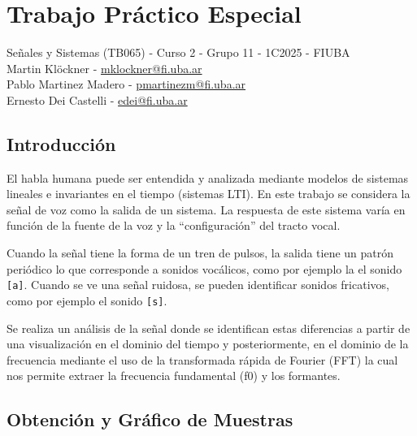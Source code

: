 \documentclass[11pt]{article}
\begin{document}
    
    
    
    
    \vspace{2em}
    

    
    \hypertarget{trabajo-pruxe1ctico-especial}{%
\section{Trabajo Práctico Especial}\label{trabajo-pruxe1ctico-especial}}

Señales y Sistemas (TB065) - Curso 2 - Grupo 11 - 1C2025 - FIUBA\\
Martin Klöckner -
\href{mailto:mklockner@fi.uba.ar}{mklockner@fi.uba.ar}\\
Pablo Martinez Madero -
\href{mailto:pmartinezm@fi.uba.ar}{pmartinezm@fi.uba.ar}\\
Ernesto Dei Castelli -
\href{mailto:edei@fi.uba.ar}{edei@fi.uba.ar}

    \hypertarget{introducciuxf3n}{%
\subsection{Introducción}\label{introducciuxf3n}}

El habla humana puede ser entendida y analizada mediante modelos de
sistemas lineales e invariantes en el tiempo (sistemas LTI). En este
trabajo se considera la señal de voz como la salida de un sistema. La
respuesta de este sistema varía en función de la fuente de la voz y la
``configuración'' del tracto vocal.

Cuando la señal tiene la forma de un tren de pulsos, la salida tiene un
patrón periódico lo que corresponde a sonidos vocálicos, como por
ejemplo la el sonido \texttt{{[}a{]}}. Cuando se ve una señal ruidosa,
se pueden identificar sonidos fricativos, como por ejemplo el sonido
\texttt{{[}s{]}}.

Se realiza un análisis de la señal donde se identifican estas
diferencias a partir de una visualización en el dominio del tiempo y
posteriormente, en el dominio de la frecuencia mediante el uso de la
transformada rápida de Fourier (FFT) la cual nos permite extraer la
frecuencia fundamental (f0) y los formantes.

    \hypertarget{obtenciuxf3n-y-gruxe1fico-de-muestras}{%
\subsection{Obtención y Gráfico de
Muestras}\label{obtenciuxf3n-y-gruxe1fico-de-muestras}}
\end{document}
